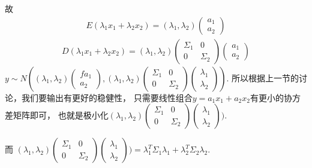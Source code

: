 \documentclass{amsart}
\begin{document}
  故
  \begin{equation}
    \label{eq:01}
        \begin{aligned}
E(\lambda_1x_1+\lambda_2x_2)=(\lambda_1,\lambda_2)
\begin{pmatrix}
  a_1\\
  a_2
\end{pmatrix}
    \end{aligned}
  \end{equation}
  \begin{equation}
    \label{eq:01}
        \begin{aligned}
D(\lambda_1x_1+\lambda_2x_2)=(\lambda_1,\lambda_2)
\begin{pmatrix}
  \Sigma_1 & 0\\
 0 & \Sigma_2
\end{pmatrix}
\begin{pmatrix}
  a_1\\
  a_2
\end{pmatrix}
    \end{aligned}
  \end{equation}
  \( y\sim N\left((\lambda_1,\lambda_2)
\begin{pmatrix}f
  a_1\\
  a_2
\end{pmatrix}
,
(\lambda_1,\lambda_2)
\begin{pmatrix}
  \Sigma_1 & 0\\
 0 & \Sigma_2
\end{pmatrix}
\begin{pmatrix}
  \lambda_1\\
  \lambda_2
\end{pmatrix}
\right)\).
  所以根据上一节的讨论，我们要输出有更好的稳健性，
  只需要线性组合$y=a_1x_1+a_2x_2$有更小的协方差矩阵即可，
  也就是极小化$(\lambda_1,\lambda_2)
\begin{pmatrix}
  \Sigma_1 & 0\\
 0 & \Sigma_2
\end{pmatrix}
\begin{pmatrix}
  \lambda_1\\
  \lambda_2
\end{pmatrix}
) $.

而 $(\lambda_1,\lambda_2)
\begin{pmatrix}
  \Sigma_1 & 0\\
 0 & \Sigma_2
\end{pmatrix}
\begin{pmatrix}
  \lambda_1\\
  \lambda_2
\end{pmatrix}
) =\lambda_1^T\Sigma_1\lambda_1+\lambda_2^T\Sigma_2\lambda_2$.
\end{document}
